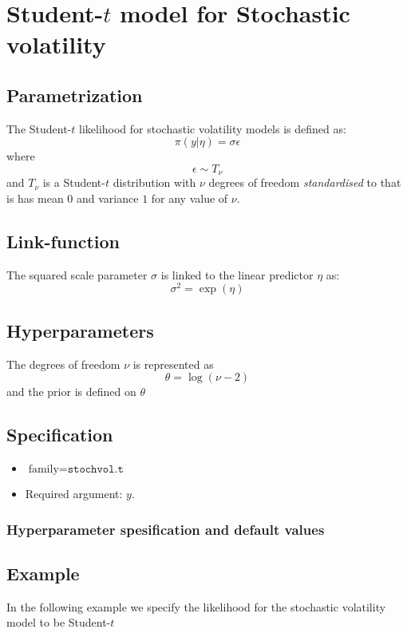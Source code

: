 \documentclass[a4paper,11pt]{article}
\begin{document}
\section*{Student-$t$ model for Stochastic volatility}

\subsection*{Parametrization}

The Student-$t$ likelihood for stochastic volatility models is defined as:
\[
\pi(y |\eta )=\sigma \epsilon 
\]
where
\[
\epsilon \sim T_{\nu}
\]
and $T_{\nu}$ is a Student-$t$ distribution with $\nu$ degrees of freedom {\it standardised} to that is has mean $0$ and variance $1$ for any value of $\nu$.

\subsection*{Link-function}

The squared scale parameter $\sigma$ is linked to the linear predictor $\eta $ as:
\[
\sigma^{2} =\exp(\eta)
\]

\subsection*{Hyperparameters}

The degrees of freedom $\nu$ is represented as
\[
\theta=\log(\nu-2)
\]
and the prior is defined on $\theta$

\subsection*{Specification}

\begin{itemize}
\item $\text{family}=\texttt{stochvol.t}$
\item Required argument: $y$.
\end{itemize}

\subsubsection*{Hyperparameter spesification and default values}


\subsection*{Example}
In the following example we specify the likelihood for the stochastic
volatility model to be Student-$t$
 
\end{document}

